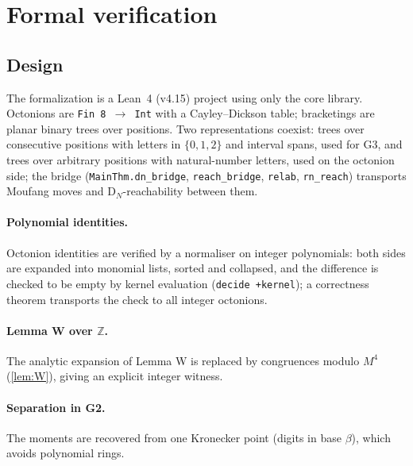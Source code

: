 \documentclass[11pt,a4paper]{article}
\theoremstyle{definition}
\theoremstyle{remark}
\newcommand{\ZZ}{\mathbb{Z}}
\newcommand{\DN}{\mathrm{D}_N}
\newcommand{\lean}[1]{\texttt{#1}}
\begin{document}
\section{Formal verification}\label{sec:formal}

\subsection{Design}
The formalization is a Lean~4 (v4.15) project using only the core library. Octonions are
\lean{Fin 8 $\to$ Int} with a Cayley--Dickson table; bracketings are planar binary trees over
positions. Two representations coexist: trees over consecutive positions with letters in $\{0,1,2\}$
and interval spans, used for G3, and trees over arbitrary positions with natural-number letters, used on
the octonion side; the bridge (\lean{MainThm.dn\_bridge}, \lean{reach\_bridge}, \lean{relab},
\lean{rn\_reach}) transports Moufang moves and $\DN$-reachability between them.

\paragraph{Polynomial identities.} Octonion identities are verified by a normaliser on integer
polynomials: both sides are expanded into monomial lists, sorted and collapsed, and the difference is
checked to be empty by kernel evaluation (\lean{decide +kernel}); a correctness theorem transports the
check to all integer octonions.

\paragraph{Lemma W over $\ZZ$.} The analytic expansion of Lemma W is replaced by congruences modulo
$M^4$ (\cref{lem:W}), giving an explicit integer witness.

\paragraph{Separation in G2.} The moments are recovered from one Kronecker point (digits in base
$\beta$), which avoids polynomial rings.
\end{document}
